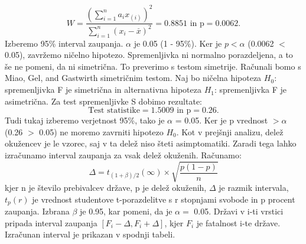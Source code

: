 \documentclass[a4paper,11pt]{article}
\begin{document}
\[W = \frac{(\sum_{i = 1}^{n}a_i x_{(i)})^2}{\sum_{i = 1}^{n}(x_i - \overset{\_}{x})^2} = 0.8851 \text{ in p} = 0.0062. \]
Izberemo 95\% interval zaupanja. \(\alpha\) je 0.05 (1 - 95\%). Ker je \(p < \alpha\) (0.0062 \(<\) 0.05), zavržemo ničelno hipotezo. Spremenljivka ni normalno porazdeljena, a to še ne pomeni, da ni simetrična. To preverimo s testom simetrije. Računali bomo s Miao, Gel, and Gastwirth simetričnim testom. Naj bo ničelna hipoteza \(H_0\): spremenljivka F je simetrična in alternativna hipoteza \(H_1\): spremenljivka F je asimetrična. Za test spremenljivke S dobimo rezultate:
\[\text{Test statistike} = 1.5009 \text{ in p} =  0.26.\]
Tudi tukaj izberemo verjetnost 95\%, tako je \(\alpha\) = 0.05. Ker je p vrednost \(> \alpha\) (0.26 \(>\) 0.05) ne moremo zavrniti hipotezo \(H_0\). Kot v prejšnji analizu, delež okužencev je le vzorec, saj v ta delež niso šteti asimptomatiki. Zaradi tega lahko izračunamo interval zaupanja za vsak delež okuženih. Računamo:
\[\Delta = t_{(1 + \beta) /2}(\infty) \times \sqrt{\frac{p(1 - p)}{n}}\]
kjer n je število prebivalcev države, p je delež okuženih, \(\Delta\) je razmik intervala, \(t_{p}(r)\) je vrednost studentove t-porazdelitve s r stopnjami svobode in p procent zaupanja. Izbrana \(\beta\) je 0.95, kar pomeni, da je \(\alpha = \) 0.05. Državi v i-ti vrstici pripada interval zaupanja \([F_i - \Delta, F_i + \Delta]\), kjer \(F_i\) je fatalnost i-te države. Izračunan interval je prikazan v spodnji tabeli.
\begin{center}
\end{center}
\end{document}
